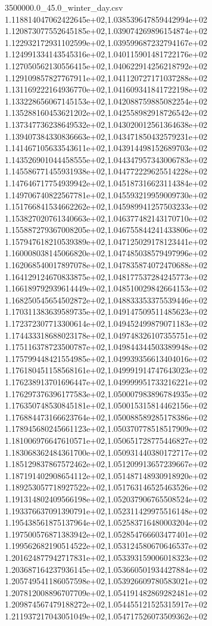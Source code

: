 \begin{filecontents*}{3500000.0_45.0_winter_day.csv}
1.118814047062422645e+02,1.038539647859442994e+02
1.120873077552645185e+02,1.039074269896154874e+02
1.122932172931102599e+02,1.039599687232794167e+02
1.124991334143545316e+02,1.040115901481722176e+02
1.127050562130556415e+02,1.040622914256218792e+02
1.129109857827767911e+02,1.041120727171037288e+02
1.131169222164936770e+02,1.041609341841722198e+02
1.133228656067145153e+02,1.042088759885082254e+02
1.135288160453621202e+02,1.042558982918726542e+02
1.137347736238649532e+02,1.043020012561364638e+02
1.139407384330836663e+02,1.043471850432579231e+02
1.141467105633543611e+02,1.043914498152689703e+02
1.143526901044458555e+02,1.044347957343006783e+02
1.145586771455931938e+02,1.044772229625514228e+02
1.147646717754939942e+02,1.045187316623114384e+02
1.149706740822567781e+02,1.045593219959009730e+02
1.151766841534662262e+02,1.045989941257503233e+02
1.153827020761340663e+02,1.046377482143170710e+02
1.155887279367008205e+02,1.046755844241433806e+02
1.157947618210539389e+02,1.047125029178123441e+02
1.160008038145066820e+02,1.047485038579497996e+02
1.162068540017897078e+02,1.047835874072470688e+02
1.164129124670833875e+02,1.048177537284245773e+02
1.166189792939614449e+02,1.048510029842664153e+02
1.168250545654502872e+02,1.048833353375539446e+02
1.170311383639589735e+02,1.049147509511485623e+02
1.172372307713300614e+02,1.049452499879071183e+02
1.174433318688023178e+02,1.049748326107355751e+02
1.175116378723500787e+02,1.049844344503389948e+02
1.175799448421554985e+02,1.049939356613404016e+02
1.176180451158568161e+02,1.049991914747643023e+02
1.176238913701696447e+02,1.049999951733216221e+02
1.176297376396177583e+02,1.050007983896784935e+02
1.176350748530845181e+02,1.050015315814462156e+02
1.176884473166623764e+02,1.050088589285178386e+02
1.178945680245661123e+02,1.050370778518517909e+02
1.181006976647610571e+02,1.050651728775446827e+02
1.183068362484361700e+02,1.050931440380172717e+02
1.185129837867572462e+02,1.051209913657239667e+02
1.187191402908654112e+02,1.051487148930918920e+02
1.189253057718927522e+02,1.051763146525463526e+02
1.191314802409566198e+02,1.052037906765508524e+02
1.193376637091390791e+02,1.052311429975516148e+02
1.195438561875137964e+02,1.052583716480003204e+02
1.197500576871383942e+02,1.052854766603477401e+02
1.199562682190514522e+02,1.053124580670646537e+02
1.201624877942717831e+02,1.053393159006018323e+02
1.203687164237936145e+02,1.053660501934427884e+02
1.205749541186057598e+02,1.053926609780583021e+02
1.207812008896707709e+02,1.054191482869282481e+02
1.209874567479188272e+02,1.054455121525315917e+02
1.211937217043051049e+02,1.054717526073509362e+02

\end{filecontents*}
